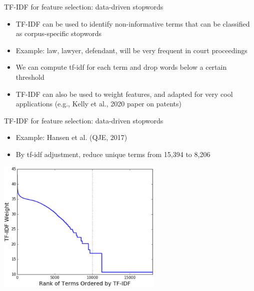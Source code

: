 \documentclass[english]{beamer}
\begin{document}
\begin{frame}{TF-IDF for feature selection: data-driven stopwords}
\begin{itemize}
\setlength{\itemsep}{1.1em}
\item TF-IDF can be used to identify non-informative terms that can be classified as corpus-specific stopwords
\item Example: law, lawyer, defendant, will be very frequent in court proceedings
\item We can compute tf-idf for each term and drop words below a certain threshold
\item TF-IDF can also be used to weight features, and adapted for very cool applications (e.g., Kelly et al., 2020 paper on patents)

\end{itemize}
\end{frame}

\begin{frame}{TF-IDF for feature selection: data-driven stopwords}
\begin{itemize}
\setlength{\itemsep}{0.5\baselineskip}
    \item Example: Hansen et al. (QJE, 2017)
    \item By tf-idf adjustment, reduce unique terms from 15,394 to 8,206
\end{itemize}

\begin{center}
\includegraphics[height=2.5in]{Images/fig17}
\end{center}
\end{frame}
\end{document}

